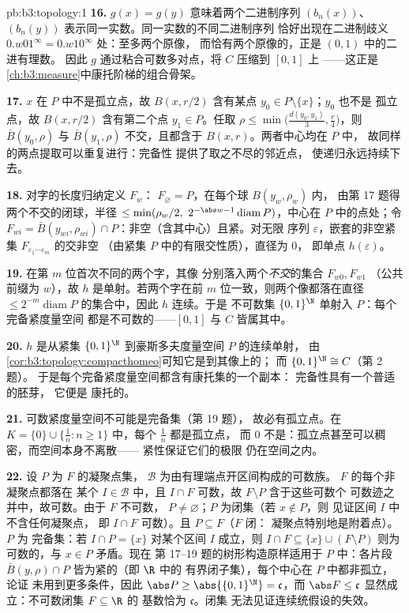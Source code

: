 \begin{solution}{pb:b3:topology:1}
\textbf{16.} $g(x) = g(y)$ 意味着两个二进制序列
$(b_n(x))$、$(b_n(y))$ 表示同一实数。同一实数的不同二进制序列
恰好出现在二进制歧义
$0.w01^\infty = 0.w10^\infty$ 处：至多两个原像，
而恰有两个原像的，正是 $(0,1)$ 中的二进有理数。
因此 $g$ 通过粘合可数多对点，将 $C$ 压缩到 $[0,1]$ 上
——这正是
\cref{ch:b3:measure}中康托阶梯的组合骨架。

\textbf{17.} $x$ 在 $P$ 中不是孤立点，故 $B(x, r/2)$
含有某点 $y_0 \in P \setminus \{x\}$；$y_0$ 也不是
孤立点，故 $B(x, r/2)$ 含有第二个点 $y_1
\in P$。任取 $\rho \leq \min\bigl(\frac{d(y_0,y_1)}3,
\frac r4\bigr)$，则 $\bar B(y_0, \rho)$ 与 $\bar B(y_1,
\rho)$ 不交，且都含于 $B(x, r)$。两者中心均在 $P$ 中，
故同样的两点提取可以重复进行：完备性
提供了取之不尽的邻近点，
使递归永远持续下去。

\textbf{18.} 对字的长度归纳定义 $F_w$：
$F_\varnothing = P$，在每个球 $B(y_w, \rho_w)$ 内，
由第 17 题得两个不交的闭球，半径 $\leq
\min(\rho_w/2,\ 2^{-\abs w-1}\operatorname{diam}P)$，中心在
$P$ 中的点处；令 $F_{wi} = \bar B(y_{wi}, \rho_{wi})
\cap P$：非空（含其中心）且紧。对无限
序列 $\varepsilon$，嵌套的非空紧集
$F_{\varepsilon_1\cdots\varepsilon_m}$ 的交非空
（由紧集 $P$ 中的有限交性质），直径为 $0$，
即单点 $h(\varepsilon)$。

\textbf{19.} 在第 $m$ 位首次不同的两个字，其像
分别落入两个\emph{不交}的集合 $F_{w0}, F_{w1}$
（公共前缀为 $w$），故 $h$ 是单射。若两个字在前
$m$ 位一致，则两个像都落在直径 $\leq
2^{-m}\operatorname{diam}P$ 的集合中，因此 $h$ 连续。于是
不可数集 $\{0,1\}^\N$ 单射入 $P$：每个完备紧度量空间
都是不可数的——$[0,1]$ 与 $C$
皆属其中。

\textbf{20.} $h$ 是从紧集 $\{0,1\}^\N$ 到豪斯多夫度量空间 $P$ 的连续单射，
由\cref{cor:b3:topology:compacthomeo}可知它是到其像上的；
而 $\{0,1\}^\N \cong C$（第 2 题）。
于是每个完备紧度量空间都含有康托集的一个副本：
完备性具有一个普适的胚芽，
它便是
康托的。

\textbf{21.} 可数紧度量空间不可能是完备集（第 19 题），
故必有孤立点。在 $K =
\{0\}\cup\{\frac1n : n \geq 1\}$ 中，每个 $\frac1n$ 都是孤立点，
而 $0$ 不是：孤立点甚至可以稠密，而空间本身不离散——
紧性保证它们的极限
仍在空间之内。

\textbf{22.} 设 $P$ 为 $F$ 的凝聚点集，
$\mathcal B$ 为由有理端点开区间构成的可数族。
$F$ 的每个非凝聚点都落在
某个 $I \in \mathcal B$ 中，且 $I \cap F$ 可数，故 $F
\setminus P$ 含于这些可数个
可数迹之并中，故可数。由于 $F$ 不可数，
$P \neq \varnothing$；$P$ 为闭集（若 $x \notin P$，则
见证区间 $I$ 中不含任何凝聚点，
即 $I \cap F$ 可数）。且 $P \subseteq F$（$F$ 闭：
凝聚点特别地是附着点）。$P$ 为
完备集：若 $I \cap P = \{x\}$ 对某个区间 $I$ 成立，则
$I \cap F \subseteq \{x\} \cup (F \setminus P)$ 则为
可数的，与 $x \in P$ 矛盾。现在
第 17--19 题的树形构造原样适用于 $P$ 中：各片段
$\bar B(y, \rho) \cap P$ 皆为紧的（即 $\R$ 中的
有界闭子集），每个中心在 $P$ 中都非孤立，论证
未用到更多条件，因此 $\abs P \geq
\abs{\{0,1\}^\N} = \mathfrak c$，而 $\abs F \leq \mathfrak
c$ 显然成立：不可数闭集 $F \subseteq \R$ 的
基数恰为 $\mathfrak c$。闭集
无法见证连续统假设的失效。


\end{solution}
